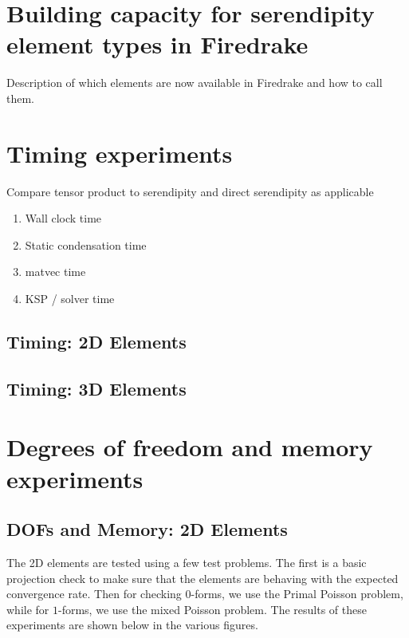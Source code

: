 \documentclass[manuscript,screen]{acmart}
\begin{document}
\section{Building capacity for serendipity element types in Firedrake}

Description of which elements are now available in Firedrake and how to call them.

\newpage
\section{Timing experiments}

Compare tensor product to serendipity and direct serendipity as applicable
\begin{enumerate}
\item Wall clock time
\item Static condensation time
\item matvec time
\item KSP / solver time
\end{enumerate}

\subsection{Timing: 2D Elements}

\subsection{Timing: 3D Elements}

\newpage
\section{Degrees of freedom and memory experiments}

\subsection{DOFs and Memory: 2D Elements}


The 2D elements are tested using a few test problems.  The first is a basic projection check to make sure that the elements are behaving with the expected convergence rate.  Then for checking $0$-forms, we use the Primal Poisson problem, while for $1$-forms, we use the mixed Poisson problem.  The results of these experiments are shown below in the various figures.  
\end{document}
